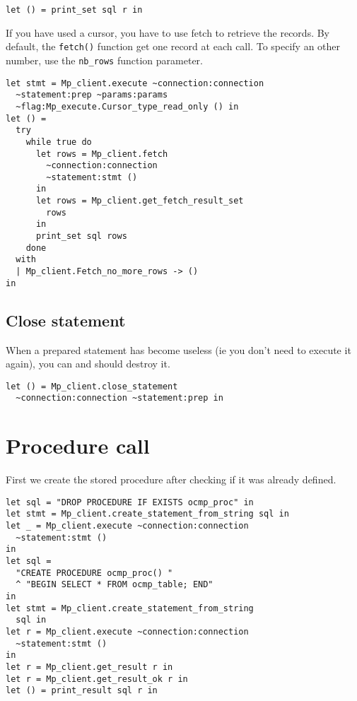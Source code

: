 \documentclass[a4paper, english, 11pt]{article}
\begin{document}
\begin{verbatim}
let () = print_set sql r in 
\end{verbatim}

If you have used a cursor, you have to use fetch to retrieve the records. By default, the \texttt{fetch()} function get one record at each call. To specify an other number, use the \texttt{nb\_rows} function parameter.

\begin{verbatim}
let stmt = Mp_client.execute ~connection:connection 
  ~statement:prep ~params:params 
  ~flag:Mp_execute.Cursor_type_read_only () in
let () = 
  try
    while true do
      let rows = Mp_client.fetch
        ~connection:connection 
        ~statement:stmt ()
      in
      let rows = Mp_client.get_fetch_result_set
        rows
      in
      print_set sql rows
    done
  with
  | Mp_client.Fetch_no_more_rows -> ()
in
\end{verbatim}

\subsection{Close statement}

When a prepared statement has become useless (ie you don't need to execute it again), you can and should destroy it.

\begin{verbatim}
let () = Mp_client.close_statement 
  ~connection:connection ~statement:prep in
\end{verbatim}

\section{Procedure call}

First we create the stored procedure after checking if it was already defined.

\begin{verbatim}
let sql = "DROP PROCEDURE IF EXISTS ocmp_proc" in
let stmt = Mp_client.create_statement_from_string sql in
let _ = Mp_client.execute ~connection:connection 
  ~statement:stmt ()
in 
let sql = 
  "CREATE PROCEDURE ocmp_proc() "
  ^ "BEGIN SELECT * FROM ocmp_table; END"
in
let stmt = Mp_client.create_statement_from_string 
  sql in
let r = Mp_client.execute ~connection:connection 
  ~statement:stmt ()
in
let r = Mp_client.get_result r in
let r = Mp_client.get_result_ok r in
let () = print_result sql r in
\end{verbatim}
\end{document}
